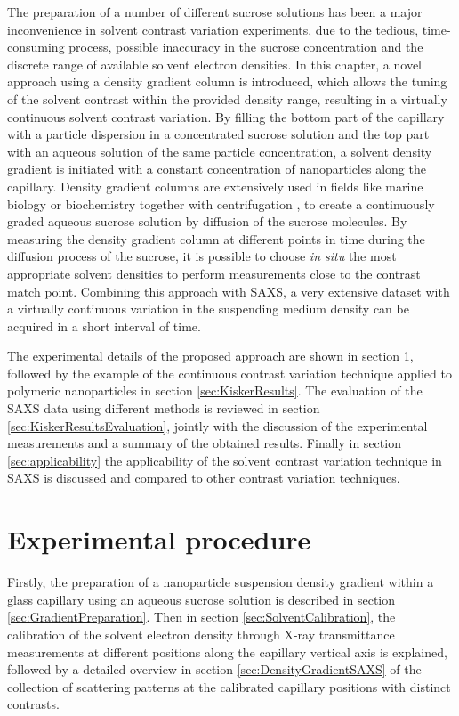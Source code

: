 The preparation of a number of different sucrose solutions has been a major inconvenience in solvent contrast variation experiments, due to the tedious, time-consuming process, possible inaccuracy in the sucrose concentration and the discrete range of available solvent electron densities. In this chapter, a novel approach using a density gradient column is introduced, which allows the tuning of the solvent contrast within the provided density range, resulting in a virtually continuous solvent contrast variation. By filling the bottom part of the capillary with a particle dispersion in a concentrated sucrose solution and the top part with an aqueous solution of the same particle concentration, a solvent density gradient is initiated with a constant concentration of nanoparticles along the capillary. Density gradient columns are extensively used in fields like marine biology \citep{coombs_density-gradient_1981} or biochemistry together with centrifugation \citep{hinton_density_1978}, to create a continuously graded aqueous sucrose solution by diffusion of the sucrose molecules. By measuring the density gradient column at different points in time during the diffusion process of the sucrose, it is possible to choose \emph{in situ} the most appropriate solvent densities to perform measurements close to the contrast match point. Combining this approach with SAXS, a very extensive dataset with a virtually continuous variation in the suspending medium density can be acquired in a short interval of time.

The experimental details of the proposed approach are shown in section \ref{sec:DensityGradientExperimental}, followed by the example of the continuous contrast variation technique applied to polymeric nanoparticles in section \ref{sec:KiskerResults}. The evaluation of the SAXS data using different methods is reviewed in section \ref{sec:KiskerResultsEvaluation}, jointly with the discussion of the experimental measurements and a summary of the obtained results. Finally in section \ref{sec:applicability} the applicability of the solvent contrast variation technique in SAXS is discussed and compared to other contrast variation techniques.

\section{Experimental procedure}
\label{sec:DensityGradientExperimental}
Firstly, the preparation of a nanoparticle suspension density gradient within a glass capillary using an aqueous sucrose solution is described in section \ref{sec:GradientPreparation}. Then in section \ref{sec:SolventCalibration}, the calibration of the solvent electron density through X-ray transmittance measurements at different positions along the capillary vertical axis is explained, followed by a detailed overview in section \ref{sec:DensityGradientSAXS} of the collection of scattering patterns at the calibrated capillary positions with distinct contrasts.


